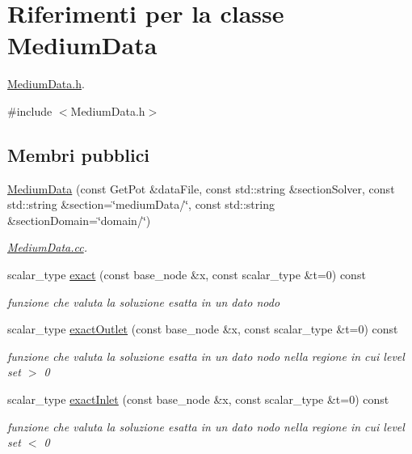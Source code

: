 \hypertarget{classMediumData}{\section{Riferimenti per la classe Medium\-Data}
\label{classMediumData}
}


\hyperlink{MediumData_8h}{Medium\-Data.\-h}.  




{\ttfamily \#include $<$Medium\-Data.\-h$>$}

\subsection*{Membri pubblici}
\begin{DoxyCompactItemize}
\item 
\hyperlink{classMediumData_aff5b247e34c08dbfa373e4cde5118da2}{Medium\-Data} (const Get\-Pot \&data\-File, const std\-::string \&section\-Solver, const std\-::string \&section=\char`\"{}medium\-Data/\char`\"{}, const std\-::string \&section\-Domain=\char`\"{}domain/\char`\"{})
\begin{DoxyCompactList}\small\item\em \hyperlink{MediumData_8cc}{Medium\-Data.\-cc}. \end{DoxyCompactList}\item 
scalar\-\_\-type \hyperlink{classMediumData_a41b88e8b0d9eb57c51e7aad518867ff1}{exact} (const base\-\_\-node \&x, const scalar\-\_\-type \&t=0) const 
\begin{DoxyCompactList}\small\item\em funzione che valuta la soluzione esatta in un dato nodo \end{DoxyCompactList}\item 
scalar\-\_\-type \hyperlink{classMediumData_adc228cb9d834aae8886ec520093a003a}{exact\-Outlet} (const base\-\_\-node \&x, const scalar\-\_\-type \&t=0) const 
\begin{DoxyCompactList}\small\item\em funzione che valuta la soluzione esatta in un dato nodo nella regione in cui level set $>$ 0 \end{DoxyCompactList}\item 
scalar\-\_\-type \hyperlink{classMediumData_a9e2ebf4af56f981be28836750fd58a17}{exact\-Inlet} (const base\-\_\-node \&x, const scalar\-\_\-type \&t=0) const 
\begin{DoxyCompactList}\small\item\em funzione che valuta la soluzione esatta in un dato nodo nella regione in cui level set $<$ 0 \end{DoxyCompactList}\item 

\end{DoxyCompactItemize}
